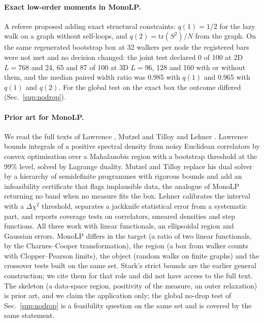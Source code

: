 \documentclass[aps,pre,twocolumn,superscriptaddress,nofootinbib,10pt]{revtex4-2}
\begin{document}
\paragraph*{Exact low-order moments in \textsf{MonoLP}.}
A referee proposed adding exact structural constraints: $q(1)=1/2$ for the lazy walk on a graph without self-loops, and $q(2)=\mathrm{tr}(S^2)/N$ from the graph. On the same regenerated bootstrap box at 32 walkers per node the registered bars were not met and no decision changed: the joint test declared 0 of 100 at 2D $L=768$ and 24, 65 and 87 of 100 at 3D $L=96$, 128 and 160 with or without them, and the median paired width ratio was 0.985 with $q(1)$ and 0.965 with $q(1)$ and $q(2)$. For the global test on the exact box the outcome differed (Sec.~\ref{sup:nodrop}).

\paragraph*{Prior art for \textsf{MonoLP}.}\label{sup:prior}
We read the full texts of Lawrence \cite{lawrence2024}, Mutzel and Tilloy \cite{mutzel2026} and Lehner \cite{lehner2026}. Lawrence bounds integrals of a positive spectral density from noisy Euclidean correlators by convex optimisation over a Mahalanobis region with a bootstrap threshold at the 99\% level, solved by Lagrange duality. Mutzel and Tilloy replace his dual solver by a hierarchy of semidefinite programmes with rigorous bounds and add an infeasibility certificate that flags implausible data, the analogue of \textsf{MonoLP} returning no band when no measure fits the box. Lehner calibrates the interval with a $\Delta\chi^2$ threshold, separates a jackknife statistical error from a systematic part, and reports coverage tests on correlators, smeared densities and step functions. All three work with linear functionals, an ellipsoidal region and Gaussian errors. \textsf{MonoLP} differs in the target (a ratio of two linear functionals, by the Charnes--Cooper transformation), the region (a box from walker counts with Clopper--Pearson limits), the object (random walks on finite graphs) and the crossover tests built on the same set. Stark's strict bounds \cite{stark1992} are the earlier general construction; we cite them for that role and did not have access to the full text. The skeleton (a data-space region, positivity of the measure, an outer relaxation) is prior art, and we claim the application only; the global no-drop test of Sec.~\ref{sup:nodrop} is a feasibility question on the same set and is covered by the same statement.
\end{document}
